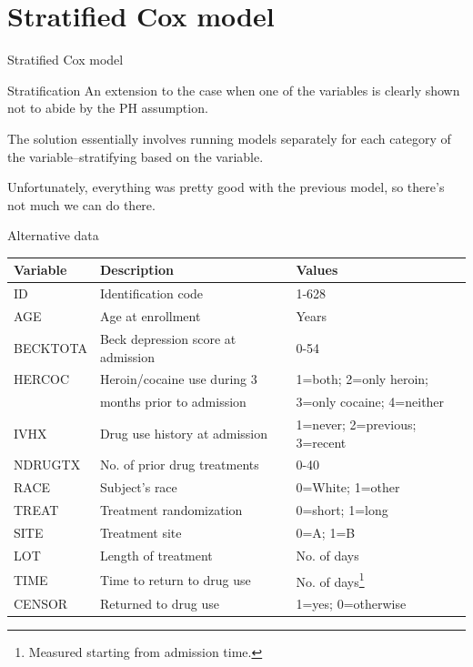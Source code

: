 \documentclass[12pt,english,pdf,xcolor=dvipsnames,aspectratio=169,handout]{beamer}\usepackage[]{graphicx}\usepackage[]{xcolor}
\begin{document}
\section{Stratified Cox model}

\begin{frame}

\begin{center}
\huge Stratified Cox model
\end{center}
\end{frame}



\begin{frame}{Stratification}
An extension to the case when one of the variables is clearly shown not to abide by the PH assumption.\bigskip

The solution essentially involves running models separately for each category of the variable--stratifying based on the variable.\bigskip

Unfortunately, everything was pretty good with the previous model, so there's not much we can do there.
\end{frame}



\begin{frame}{Alternative data}
\begin{table}
\centering
\scriptsize
\begin{tabular}{l l l}
\toprule
Variable & Description & Values \\
\midrule
ID & Identification code & 1-628\\
AGE & Age at enrollment & Years \\
BECKTOTA & Beck depression score at admission & 0-54 \\
HERCOC & Heroin/cocaine use during 3 & 1=both; 2=only heroin; \\
       & months prior to admission   & 3=only cocaine; 4=neither \\
IVHX & Drug use history at admission & 1=never; 2=previous; 3=recent \\
NDRUGTX & No. of prior drug treatments & 0-40 \\
RACE & Subject's race & 0=White; 1=other \\
TREAT & Treatment randomization & 0=short; 1=long \\
SITE & Treatment site & 0=A; 1=B \\
LOT & Length of treatment & No. of days \\
TIME & Time to return to drug use & No. of days\footnote{Measured starting from admission time.} \\
CENSOR & Returned to drug use & 1=yes; 0=otherwise \\
\bottomrule
\end{tabular}
\end{table}
\end{frame}
\end{document}
